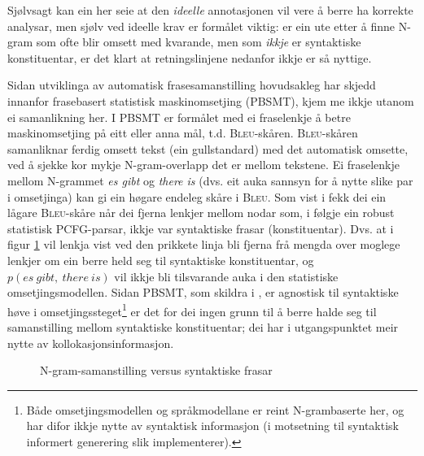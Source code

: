 \documentclass[11pt,a4paper,oneside,draft]{book}
\newcommand{\Bleu}{\textsc{Bleu}}
\begin{document}
Sjølvsagt kan ein her seie at den \emph{ideelle} annotasjonen vil vere å
berre ha korrekte analysar, men sjølv ved ideelle krav er formålet
viktig: er ein ute etter å finne N-gram som ofte blir omsett med
kvarande, men som \emph{ikkje} er syntaktiske konstituentar, er det klart
at retningslinjene nedanfor ikkje er så nyttige.

Sidan utviklinga av automatisk frasesamanstilling hovudsakleg har
skjedd innanfor frasebasert statistisk maskinomsetjing (PBSMT), kjem
me ikkje utanom ei samanlikning her. I PBSMT er formålet med ei
fraselenkje å betre maskinomsetjing på eitt eller anna mål,
t.d. \Bleu-skåren. \Bleu-skåren samanliknar ferdig omsett tekst (ein
gullstandard) med det automatisk omsette, ved å sjekke kor mykje
N-gram-overlapp det er mellom tekstene. Ei fraselenkje mellom
N-grammet \emph{es gibt} og \emph{there is} (dvs. eit auka sannsyn for å nytte
slike par i omsetjinga) kan gi ein høgare endeleg skåre i \Bleu. Som
vist i \citet{koehn2003spb} fekk dei ein lågare \Bleu-skåre når dei
  fjerna lenkjer mellom nodar som, i følgje ein robust
statistisk PCFG-parsar, ikkje var syntaktiske frasar
(konstituentar). Dvs. at i figur \ref{fig:ikkjenode} vil lenkja vist
ved den prikkete linja bli fjerna frå mengda over moglege lenkjer om
ein berre held seg til syntaktiske konstituentar, og
$p(es~gibt,~there~is)$ vil ikkje bli tilsvarande auka i den
statistiske omsetjingsmodellen. Sidan PBSMT, som skildra i
\citet{koehn2003spb}, er agnostisk til syntaktiske høve i
omsetjingssteget\footnote{Både omsetjingsmodellen og
språkmodellane er reint N-grambaserte her, og har difor ikkje nytte av
syntaktisk informasjon (i motsetning til syntaktisk informert
generering slik \citet{riezler2006gmt} implementerer). } er det for dei ingen grunn til å berre halde
seg til samanstilling mellom syntaktiske konstituentar; dei har i
utgangspunktet meir nytte av kollokasjonsinformasjon.

  \begin{figure}[htp]
    \vfill{} %
   \caption{N-gram-samanstilling versus syntaktiske frasar}
    \label{fig:ikkjenode}
  \end{figure}
\end{document}
